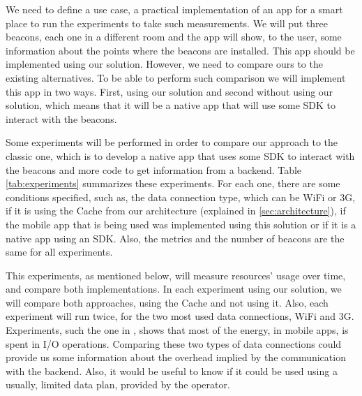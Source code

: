 We need to define a use case, a practical implementation
of an app for a smart place to run the experiments
to take such measurements. We will put three beacons,
each one in a different room and the app will show, to the user,
some information about the points where the beacons
are installed.
This app should be implemented using our solution.
However, we need to compare ours to the existing
alternatives. To be able to perform such comparison
we will implement this app in two ways.
First, using our solution and second without using
our solution, which means that it will be a native
app that will use some SDK to interact with the
beacons.

Some experiments will be performed in order to compare
our approach to the classic one, which is to develop a
native app that uses some SDK to interact with the beacons
and more code to get information from a backend.
Table \ref{tab:experiments} summarizes these experiments.
For each one, there are some conditions specified, such as,
the data connection type, which can be WiFi or 3G, if
it is using the Cache from our architecture (explained in 
\ref{sec:architecture}), if the mobile app that is being
used was implemented using this solution or if it is
a native app using an SDK. 
Also, the metrics and the number of beacons
are the same for all experiments.



This experiments, as mentioned below, 
will measure resources' usage over time, 
and compare both implementations. In each
experiment using our solution, we will
compare both approaches, using the Cache
and not using it. Also, each experiment
will run twice, for the two most used
data connections, WiFi and 3G.
Experiments, such the one
in \cite{Pathak2012}, shows that most of the energy, 
in mobile apps,
is spent in I/O operations.
Comparing these
two types of data connections could provide us
some information about the
overhead implied by the communication with
the backend. Also, it would be useful to
know if it could be used using
a usually, limited data plan, provided by
the operator.

